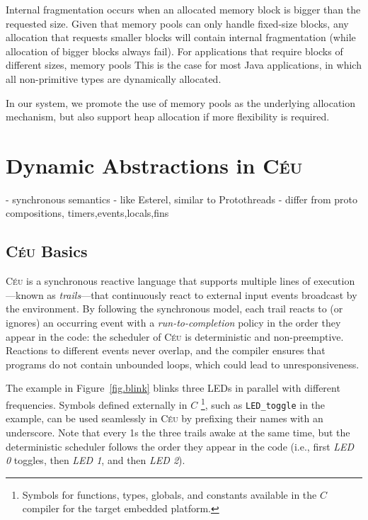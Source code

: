 \documentclass{llncs}
\newcommand{\CEU}{\textsc{C\'{e}u}\xspace}
\newcommand{\code}[1] {{\small{\texttt{#1}}}}
\begin{document}
Internal fragmentation occurs when an allocated memory block is bigger than the 
requested size.
Given that memory pools can only handle fixed-size blocks, any allocation that 
requests smaller blocks will contain internal fragmentation (while allocation 
of bigger blocks always fail).
For applications that require blocks of different sizes, memory pools
This is the case for most Java applications, in which all non-primitive types 
are dynamically allocated.

In our system, we promote the use of memory pools as the underlying allocation 
mechanism, but also support heap allocation if more flexibility is required.

\section{Dynamic Abstractions in \CEU}

- synchronous semantics
- like Esterel, similar to Protothreads
- differ from proto compositions, timers,events,locals,fins

\subsection{\CEU Basics}

\begin{comment}
- deterministic and bounded execution
- shared memory concurrency
- integration with C
- locals and finalization
- first-class timers
- internal events
\end{comment}

\CEU is a synchronous reactive language that supports multiple lines of 
execution---known as \emph{trails}---that continuously react to external input 
events broadcast by the environment.
%
By following the synchronous model, each trail reacts to (or ignores) an 
occurring event with a \emph{run-to-completion} policy in the order they appear 
in the code: the scheduler of \CEU is deterministic and non-preemptive.
%
Reactions to different events never overlap, and the compiler ensures that 
programs do not contain unbounded loops, which could lead to unresponsiveness.

The example in Figure~\ref{fig.blink} blinks three LEDs in parallel with 
different frequencies.
%
Symbols defined externally in $C$%
\footnote{Symbols for functions, types, globals, and constants available in the 
$C$ compiler for the target embedded platform.
}, such as \code{LED\_toggle} in the example, can be used seamlessly in \CEU by 
prefixing their names with an underscore.
%
Note that every 1s the three trails awake at the same time, but the 
deterministic scheduler follows the order they appear in the code (i.e., first 
\emph{LED 0} toggles, then \emph{LED 1}, and then \emph{LED 2}).
\end{document}
